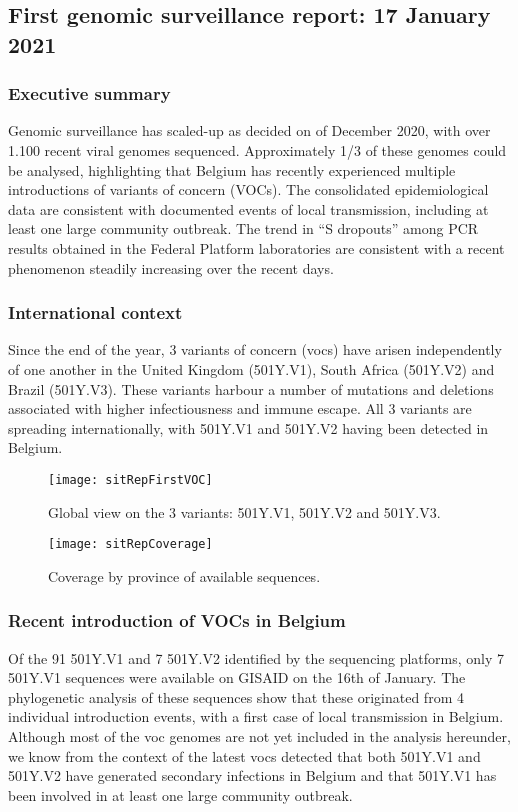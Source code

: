 \subsection{First genomic surveillance report: 17 January 2021}
\subsubsection{Executive summary}
Genomic surveillance has scaled-up as decided on  of December 2020, with over 1.100 recent viral genomes sequenced. Approximately 1/3 of these genomes could be analysed, highlighting that Belgium has recently experienced multiple introductions of variants of concern (VOCs). The consolidated epidemiological data are consistent with documented events of local transmission, including at least one large community outbreak.
The trend in ``S dropouts'' among PCR results obtained in the Federal Platform laboratories are consistent with a recent phenomenon steadily increasing over the recent days.

\subsubsection{International context}
Since the end of the year, 3 variants of concern (\gls{voc}s) have arisen independently of one another in the United Kingdom (501Y.V1), South Africa (501Y.V2) and Brazil (501Y.V3).
These variants harbour a number of mutations and deletions associated with higher infectiousness and immune escape.
All 3 variants are spreading internationally, with 501Y.V1 and 501Y.V2 having been detected in Belgium.

\begin{figure}[ht]
  \centering
  \texttt{[image: sitRepFirstVOC]}
  \caption[Global view on the 3 variants: 501Y.V1, 501Y.V2 and 501Y.V3]{Global view on the 3 variants: 501Y.V1, 501Y.V2 and 501Y.V3.}
  \label{fig:sitRepFirstVOC}
\end{figure}

\begin{figure}[ht]
  \centering
  \texttt{[image: sitRepCoverage]}
  \caption[Coverage by province of available sequences]{Coverage by province of available sequences.}
  \label{fig:sitRepCoverage}
\end{figure}

\subsubsection{Recent introduction of VOCs in Belgium}
Of the 91 501Y.V1 and 7 501Y.V2 identified by the sequencing platforms, only 7 501Y.V1 sequences were available on GISAID on the 16th of January.
The phylogenetic analysis of these sequences show that these originated from 4 individual introduction events, with a first case of local transmission in Belgium.
Although most of the \gls{voc} genomes are not yet included in the analysis hereunder, we know from the context of the latest \gls{voc}s detected that both 501Y.V1 and 501Y.V2 have generated secondary infections in Belgium and that 501Y.V1 has been involved in at least one large community outbreak.

